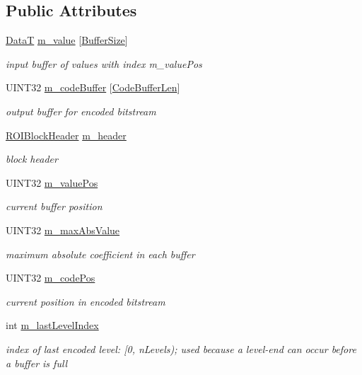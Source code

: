 \subsection*{Public Attributes}
\begin{DoxyCompactItemize}
\item 
\mbox{\hyperlink{PGFtypes_8h_acb1ee3f52ccfad782dcaa0abd79e5d05}{DataT}} \mbox{\hyperlink{classCEncoder_1_1CMacroBlock_a139b60f3f0d76b9158573e4d897423d6}{m\+\_\+value}} \mbox{[}\mbox{\hyperlink{PGFtypes_8h_aa362edf6db9662acf6ef958a6db19c35}{Buffer\+Size}}\mbox{]}
\begin{DoxyCompactList}\small\item\em input buffer of values with index m\+\_\+value\+Pos \end{DoxyCompactList}\item 
U\+I\+N\+T32 \mbox{\hyperlink{classCEncoder_1_1CMacroBlock_a527667f1e0529ff577dcbe7f0aa38d77}{m\+\_\+code\+Buffer}} \mbox{[}\mbox{\hyperlink{Encoder_8h_a05a74e73e6c734fcad194efbca053ed5}{Code\+Buffer\+Len}}\mbox{]}
\begin{DoxyCompactList}\small\item\em output buffer for encoded bitstream \end{DoxyCompactList}\item 
\mbox{\hyperlink{unionROIBlockHeader}{R\+O\+I\+Block\+Header}} \mbox{\hyperlink{classCEncoder_1_1CMacroBlock_aa5abc7cc9df3402a233367f0087168f8}{m\+\_\+header}}
\begin{DoxyCompactList}\small\item\em block header \end{DoxyCompactList}\item 
U\+I\+N\+T32 \mbox{\hyperlink{classCEncoder_1_1CMacroBlock_a7ab47e29ad9e3397869fdfb50b53e035}{m\+\_\+value\+Pos}}
\begin{DoxyCompactList}\small\item\em current buffer position \end{DoxyCompactList}\item 
U\+I\+N\+T32 \mbox{\hyperlink{classCEncoder_1_1CMacroBlock_a865f294ffa568a165224c2105bf1bb01}{m\+\_\+max\+Abs\+Value}}
\begin{DoxyCompactList}\small\item\em maximum absolute coefficient in each buffer \end{DoxyCompactList}\item 
U\+I\+N\+T32 \mbox{\hyperlink{classCEncoder_1_1CMacroBlock_a6e15685fcab5aa06f0f5ed17312774c7}{m\+\_\+code\+Pos}}
\begin{DoxyCompactList}\small\item\em current position in encoded bitstream \end{DoxyCompactList}\item 
int \mbox{\hyperlink{classCEncoder_1_1CMacroBlock_a68163a823248889d9d407f4b0331245d}{m\+\_\+last\+Level\+Index}}
\begin{DoxyCompactList}\small\item\em index of last encoded level\+: \mbox{[}0, n\+Levels); used because a level-\/end can occur before a buffer is full \end{DoxyCompactList}\end{DoxyCompactItemize}

